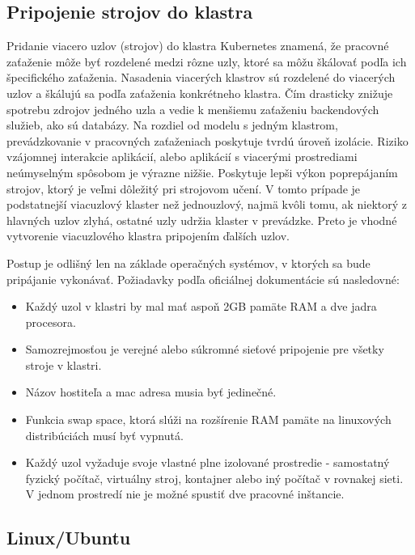 \subsection{Pripojenie strojov do klastra}

Pridanie viacero uzlov (strojov) do klastra Kubernetes znamená, že pracovné zaťaženie môže byť rozdelené medzi rôzne uzly, ktoré sa môžu škálovať podľa ich špecifického zaťaženia. Nasadenia viacerých klastrov sú rozdelené do viacerých uzlov a škálujú sa podľa zaťaženia konkrétneho klastra. Čím drasticky znižuje spotrebu zdrojov jedného uzla a vedie k menšiemu zaťaženiu backendových služieb, ako sú databázy. Na rozdiel od modelu s jedným klastrom, prevádzkovanie v pracovných zaťaženiach poskytuje tvrdú úroveň izolácie. Riziko vzájomnej interakcie aplikácií, alebo aplikácií s viacerými prostrediami neúmyselným spôsobom je výrazne nižšie. Poskytuje lepši výkon poprepájaním strojov, ktorý je veľmi dôležitý pri strojovom učení. V tomto prípade je podstatnejší viacuzlový klaster než jednouzlový, najmä kvôli tomu, ak niektorý z hlavných uzlov zlyhá, ostatné uzly udržia klaster v prevádzke. Preto je vhodné vytvorenie viacuzlového klastra pripojením ďalších uzlov.

Postup je odlišný len na základe operačných systémov, v ktorých sa bude pripájanie vykonávať. Požiadavky podľa oficiálnej dokumentácie sú nasledovné:

\begin{itemize}
    \item Každý uzol v klastri by mal mať aspoň 2GB pamäte RAM a dve jadra procesora.
    \item Samozrejmosťou je verejné alebo súkromné sieťové pripojenie pre všetky stroje v klastri.
    \item Názov hostiteľa a \acrshort{mac} adresa musia byť jedinečné.
    \item Funkcia swap space, ktorá slúži na rozšírenie RAM pamäte na linuxových distribúciách musí byť vypnutá.
    \item Každý uzol vyžaduje svoje vlastné plne izolované prostredie - samostatný fyzický počítač, virtuálny stroj, kontajner alebo iný počítač v rovnakej sieti. V jednom prostredí nie je možné spustiť dve pracovné inštancie.
\end{itemize}

\subsection*{Linux/Ubuntu}

